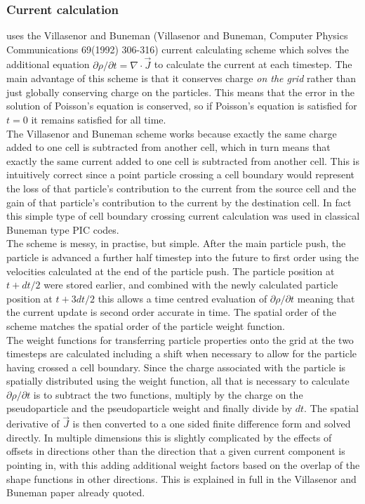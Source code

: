 \documentclass[12pt,a4paper]{article}
\newcommand{\EPOCH}{{\color{warwickdark}\fontfamily{phv}\selectfont{EPOCH}}}
\begin{document}
\subsubsection{Current calculation}
{\EPOCH} uses the Villasenor and Buneman (Villasenor and Buneman, Computer
Physics Communications 69(1992) 306-316) current calculating scheme which
solves the additional equation
${\partial \rho}/{\partial t} = \nabla\cdot\vec{J}$ to
calculate the current at each timestep. The main advantage of this scheme is
that it conserves charge {\it on the grid} rather than just globally conserving
charge on the particles. This means that the error in the solution of Poisson's
equation is conserved, so if Poisson's equation is satisfied for $t=0$ it
remains satisfied for all time.\\

The Villasenor and Buneman scheme works because exactly the same charge added
to one cell is subtracted from another cell, which in turn means that exactly
the same current added to one cell is subtracted from another cell. This is
intuitively correct since a point particle crossing a cell boundary would
represent the loss of that particle's contribution to the current from the
source cell and the gain of that particle's contribution to the current by the
destination cell. In fact this simple type of cell boundary crossing
current calculation was used in classical Buneman type PIC codes.\\

The scheme is messy, in practise, but simple. After the main particle push, the
particle is advanced a further half timestep into the future to first order
using the velocities calculated at the end of the particle push. The particle
position at $t + dt/2$ were stored earlier, and combined with the newly
calculated particle position at $t + {3dt}/{2}$ this allows a time centred
evaluation of ${\partial \rho}/{\partial t}$ meaning that the current
update is second order accurate in time. The spatial order of the scheme
matches the spatial order of the particle weight function.\\

The weight functions for transferring particle properties onto the grid at the
two timesteps are calculated including a shift when necessary to allow for the
particle having crossed a cell boundary. Since the charge associated with the
particle is spatially distributed using the weight function, all that is
necessary to calculate ${\partial \rho}/{\partial t}$ is to subtract the
two functions, multiply by the charge on the pseudoparticle and the
pseudoparticle weight and finally divide by $dt$. The spatial derivative of
$\vec{J}$ is then converted to a one sided finite difference form and solved
directly. In multiple dimensions this is slightly complicated by the effects of
offsets in directions other than the direction that a given current component
is pointing in, with this adding additional weight factors based on the overlap
of the shape functions in other directions. This is explained in full in the
Villasenor and Buneman paper already quoted.\\
\end{document}
